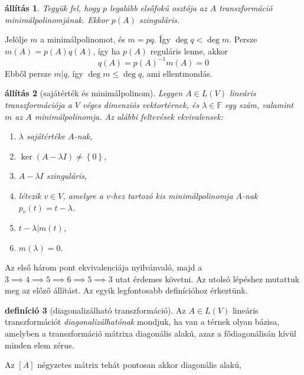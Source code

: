 \documentclass[a4paper, showtrims]{memoir}
\makeatletter
\renewenvironment{proof}[1][\proofname]
    {\par\pushQED{\qed}%
    \normalfont \topsep6\p@\@plus6\p@\relax
    \trivlist
    \item[\hskip\labelsep
        \itshape
    #1\@addpunct{:}]\ignorespaces}
    {\popQED\endtrivlist\@endpefalse}
\theoremstyle{plain}
\newtheorem{proposition}{állítás}[chapter]
\theoremstyle{remark}
\theoremstyle{definition}
\newtheorem{definition}[proposition]{definíció}
\makeatother
\begin{document}
\begin{proposition}
	Tegyük fel, hogy $p$ legalább elsőfokú osztója az $A$ transzformáció minimálpolinomjának.
	Ekkor $p\left( A \right)$ szinguláris.
\end{proposition}
\begin{proof}
	Jelölje $m$ a minimálpolinomot,
	és $m=pq$.
	Így $\deg q<\deg m$. Persze $m\left( A \right)=p\left( A \right)q\left( A \right)$,
	így ha $p\left( A \right)$ reguláris lenne,
	akkor
	\[
		q\left( A \right)=p\left( A \right)^{-1}m\left( A \right)=0
	\]
	Ebből persze $m|q$, így $\deg m\leq \deg q$, ami ellentmondás.
\end{proof}
\begin{proposition}[sajátérték és minimálpolinom]
	Legyen $A\in L\left( V \right)$ lineáris transzformációja a $V$ véges dimenziós
	vektortérnek, és $\lambda\in\mathbb{F}$ egy szám, valamint $m$ az $A$ minimálpolinomja.
	Az alábbi feltevések ekvivalensek:
	\begin{enumerate}
		\item $\lambda$ sajátértéke $A$-nak,
		\item $\ker (A-\lambda I)\neq \left\{ 0 \right\}$,
		\item $A-\lambda I$ szinguláris,
		\item létezik $v\in V$,
		      amelyre a $v$-hez tartozó kis minimálpolinomja $A$-nak $p_v(t)=t-\lambda$.
		\item $t-\lambda|m\left( t \right)$,
		\item $m\left( \lambda \right)=0.$\qedhere
	\end{enumerate}
\end{proposition}
\begin{proof}
	Az első három pont ekvivalenciája nyilvánvaló,
	majd a $3\implies 4\implies 5\implies 6\implies 5\implies 3$
	utat érdemes követni.
	Az utolsó lépéshez mutattuk meg az előző állítást.
\end{proof}
Az egyik legfontosabb definícióhoz érkeztünk.
\begin{definition}[diagonalizálható transzformáció]
	Az $A\in L\left( V \right)$ lineáris transzformációt \emph{diagonalizálhatónak}
	mondjuk,
	ha van a térnek olyan bázisa,
	amelyben a transzformáció mátrixa diagonális alakú,
	azaz a fődiagonálisán kívül minden elem zérus.
\end{definition}
Az $\left[ A \right]$ négyzetes mátrix tehát pontosan akkor diagonális alakú,
\end{document}
